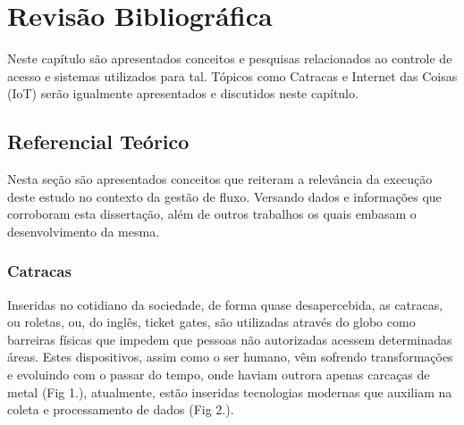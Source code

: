 \chapter{Revisão Bibliográfica}
\label{cap:revisao_bibliografica}
Neste capítulo são apresentados conceitos e pesquisas relacionados ao controle de acesso e sistemas utilizados para tal. Tópicos como Catracas e Internet das Coisas (IoT) serão igualmente apresentados e discutidos neste capítulo.
\section{Referencial Teórico}

Nesta seção são apresentados conceitos que reiteram a relevância da execução deste estudo no contexto da gestão de fluxo. Versando dados e informações que corroboram esta dissertação, além de outros trabalhos os quais embasam o desenvolvimento da mesma.
\subsection{Catracas}

Inseridas no cotidiano da sociedade, de forma quase desapercebida, as catracas, ou roletas, ou, do inglês, ticket gates, são utilizadas através do globo como barreiras físicas que impedem que pessoas não autorizadas acessem determinadas áreas. Estes dispositivos, assim como o ser humano, vêm sofrendo transformações e evoluindo com o passar do tempo, onde haviam outrora apenas carcaças de metal (Fig 1.), atualmente, estão inseridas tecnologias modernas que auxiliam na coleta e processamento de dados (Fig 2.).

